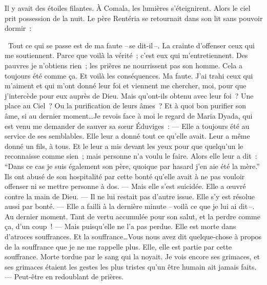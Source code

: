   Il y avait des étoiles filantes. À Comala, les lumières s'éteignirent.
\pend
%
\pstart
  Alors le ciel prit possession de la nuit.
\pend
%
\pstart
  Le père Rentéria se retournait dans son lit sans pouvoir dormir :

  \og{} Tout ce qui se passe est de ma faute --\,se dit-il\,--. La crainte d’offenser ceux qui me soutiennent. Parce que voilà la vérité ; c'est eux qui m’entretiennent. Des pauvres je n’obtiens rien ; les prières ne nourrissent pas son homme. Cela a toujours été comme ça. Et voilà les conséquences. Ma faute. J’ai trahi ceux qui m’aiment et qui m’ont donné leur foi et viennent me chercher, moi, pour que j’intercède pour eux auprès de Dieu. Mais qu’ont-ils obtenu avec leur foi ? Une place au Ciel ? Ou la purification de leurs âmes ? Et à quoi bon purifier son âme, si au dernier moment\ldots Je revois face à moi le regard de Maria Dyada, qui est venu me demander de sauver sa sœur Éduviges :
\pend
%
\pstart
  \guillemotright --- Elle a toujours été au service de ses semblables. Elle leur a donné tout ce qu’elle avait. Leur a même donné un fils, à tous. Et le leur a mis devant les yeux pour que quelqu’un le reconnaisse comme sien ; mais personne n’a voulu le faire. Alors elle leur a dit : ``Dans ce cas je suis également son père, quoique par hasard j’en aie été la mère.'' Ils ont abusé de son hospitalité par cette bonté qu’elle avait à ne pas vouloir offenser ni se mettre personne à dos.
\pend
%
\pstart
  \guillemotright --- Mais elle s’est suicidée. Elle a œuvré contre la main de Dieu.
\pend
%
\pstart
  \guillemotright --- Il ne lui restait pas d’autre issue. Elle s’y est résolue aussi par bonté.
\pend
%
\pstart
  \guillemotright --- Elle a failli à la dernière minute --\,voilà ce que je lui ai dit\,--. Au dernier moment. Tant de vertu accumulée pour son salut, et la perdre comme ça, d'un coup !
\pend
%
\pstart
  \guillemotright --- Mais puisqu’elle ne l’a pas perdue. Elle est morte dans d’atroces souffrances. Et la souffrance\ldots Vous nous avez dit quelque-chose à propos de la souffrance que je ne me rappelle plus. Elle, elle est partie par cette souffrance. Morte tordue par le sang qui la noyait. Je vois encore ses grimaces, et ses grimaces étaient les gestes les plus tristes qu’un être humain ait jamais faits.
\pend
%
\pstart
  \guillemotright --- Peut-être en redoublant de prières.
